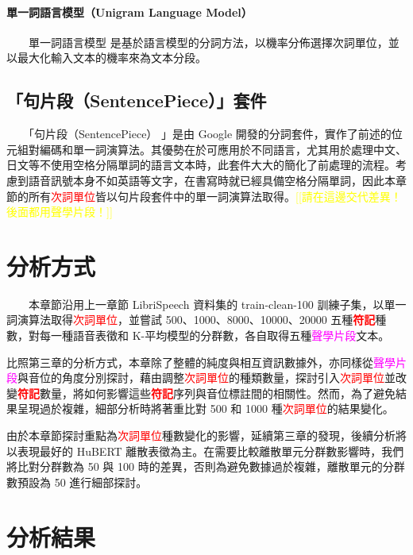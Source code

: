 \paragraph{單一詞語言模型（Unigram Language Model）} \hfill \break
%
　　單一詞語言模型 \cite{kudo2018subword} 是基於語言模型的分詞方法，以機率分佈選擇次詞單位，並以最大化輸入文本的機率來為文本分段。

\subsection{「句片段（SentencePiece）」套件}

　　「句片段（SentencePiece） \cite{kudo_sentencepiece_2018}」是由 Google 開發的分詞套件，實作了前述的位元組對編碼和單一詞演算法。其優勢在於可應用於不同語言，尤其用於處理中文、日文等不使用空格分隔單詞的語言文本時，此套件大大的簡化了前處理的流程。考慮到語音訊號本身不如英語等文字，在書寫時就已經具備空格分隔單詞，因此本章節的所有\textcolor{red}{次詞單位}皆以句片段套件中的單一詞演算法取得。\textcolor{yellow}{[[請在這邊交代差異！後面都用聲學片段！]]}

\section{分析方式}

　　本章節沿用上一章節 LibriSpeech 資料集的 train-clean-100 訓練子集，以單一詞演算法取得\textcolor{red}{次詞單位}，並嘗試 500、1000、8000、10000、20000 五種\textbf{\textcolor{red}{符記}}種數，對每一種語音表徵和 K-平均模型的分群數，各自取得五種\textcolor{magenta}{聲學片段}文本。

        比照第三章的分析方式，本章除了整體的純度與相互資訊數據外，亦同樣從\textcolor{magenta}{聲學片段}與音位的角度分別探討，藉由調整\textcolor{red}{次詞單位}的種類數量，探討引入\textcolor{red}{次詞單位}並改變\textbf{\textcolor{red}{符記}}數量，將如何影響這些\textbf{\textcolor{red}{符記}}序列與音位標註間的相關性。然而，為了避免結果呈現過於複雜，細部分析時將著重比對 500 和 1000 種\textcolor{red}{次詞單位}的結果變化。

        由於本章節探討重點為\textcolor{red}{次詞單位}種數變化的影響，延續第三章的發現，後續分析將以表現最好的 HuBERT 離散表徵為主。在需要比較離散單元分群數影響時，我們將比對分群數為 50 與 100 時的差異，否則為避免數據過於複雜，離散單元的分群數預設為 50 進行細部探討。

\section{分析結果} 


